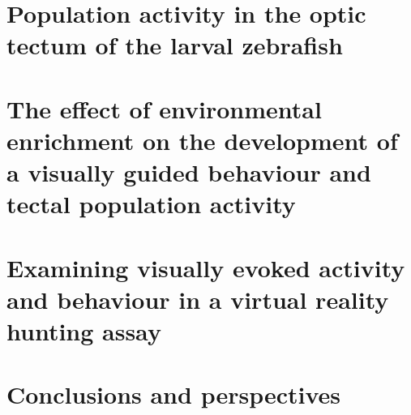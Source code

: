 \documentclass[a4paper,12pt,oneside]{report}
\begin{document}
    \chapter{Population activity in the optic tectum of the larval zebrafish}
    
    
    \chapter{The effect of environmental enrichment on the development of a visually guided behaviour and tectal population activity}
    
    
   \chapter{Examining visually evoked activity and behaviour in a virtual reality hunting assay}
   
   
   \chapter{Conclusions and perspectives}
   
    
    \printbibliography
    
\end{document}
